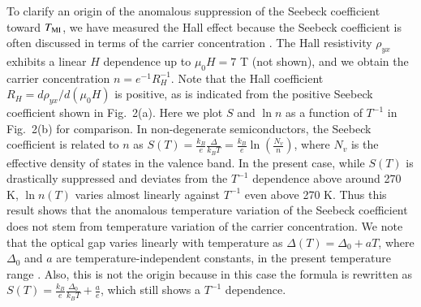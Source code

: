 \documentclass[aps,twocolumn,showpacs,preprintnumbers,amsmath,amssymb,floats,citeautoscript,nobalancelastpage]{revtex4-1}
\begin{document}
To clarify an origin of the anomalous suppression of the Seebeck coefficient toward $T_{\rm MI}$,
we have measured the Hall effect 
because the Seebeck coefficient is often discussed in terms of the carrier concentration \cite{Mahan1998}.
The Hall resistivity $\rho_{yx}$ exhibits a linear $H$ dependence up to $\mu_0H = 7$ T (not shown),
and we obtain the carrier concentration 
$n = e^{-1}R_H^{-1}$.
Note that the Hall coefficient $R_H=d\rho_{yx}/d(\mu_0H)$ is positive, 
as is indicated from the positive Seebeck coefficient shown in Fig.~2(a).
Here we plot $S$ and $\ln n$ as a function of $T^{-1}$ in Fig.~2(b)
for comparison.
In non-degenerate semiconductors, the Seebeck coefficient is related to $n$ as 
$S(T) = \frac{k_B}{e}\frac{\Delta}{k_BT} =\frac{k_B}{e}\ln(\frac{N_v}{n})$,
where $N_v$ is the effective density of states in the valence band.
In the present case, 
while $S(T)$ is drastically suppressed and deviates from the $T^{-1}$ dependence above around 270 K,
$\ln n(T)$  varies almost linearly against $T^{-1}$ even above 270 K.
Thus this result shows that 
the anomalous temperature variation of the Seebeck coefficient does not stem from
temperature variation of the carrier concentration.
We note that the optical gap varies linearly with temperature as 
$\Delta(T) = \Delta_0+aT$, where $\Delta_0$ and $a$ are temperature-independent constants,
in the present temperature range \cite{Jung2003}.
Also, this is not the origin because in this case
the formula is rewritten as 
$S(T) = \frac{k_B}{e}\frac{\Delta_0}{k_BT} + \frac{a}{e}$, 
which still shows a $T^{-1}$ dependence.
\end{document}
